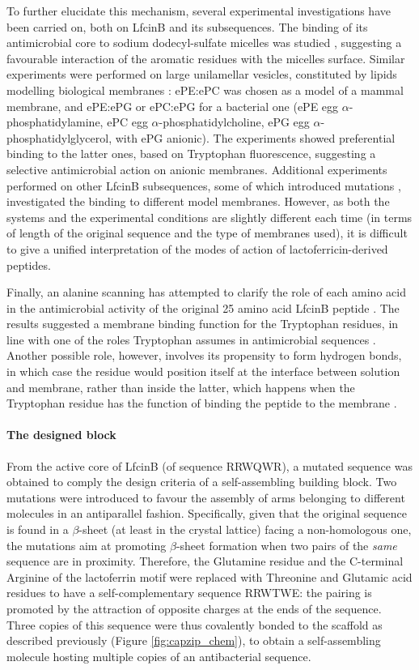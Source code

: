 To further elucidate this mechanism, several experimental investigations have been carried on, both on LfcinB and its subsequences. The binding of its antimicrobial core to sodium dodecyl-sulfate micelles was studied \citep{Schibli1999}, suggesting a favourable interaction of the aromatic residues with the micelles surface.
%
Similar experiments were performed on large unilamellar vesicles, constituted by lipids modelling biological membranes \citep{Nguyen2005}: ePE:ePC was chosen as a model of a mammal membrane, and ePE:ePG or ePC:ePG for a bacterial one (ePE egg $\alpha$-phosphatidylamine, ePC egg $\alpha$-phosphatidylcholine, ePG egg $\alpha$-phosphatidylglycerol, with ePG anionic). The experiments showed preferential binding to the latter ones, based on Tryptophan fluorescence, suggesting a selective antimicrobial action on anionic membranes.
%
Additional experiments performed on other LfcinB subsequences, some of which introduced mutations \citep{Tsutsumi2012,Arseneault2010}, investigated the binding to different model membranes. However, as both the systems and the experimental conditions are slightly different each time (in terms of length of the original sequence and the type of membranes used), it is difficult to give a unified interpretation of the modes of action of lactoferricin-derived peptides.

Finally, an alanine scanning has attempted to clarify the role of each amino acid in the antimicrobial activity of the original 25 amino acid LfcinB peptide \citep{Strom2002}. The results suggested a membrane binding function for the Tryptophan residues, in line with one of the roles Tryptophan assumes in antimicrobial sequences \citep{Chan2006}.
%
Another possible role, however, involves its propensity to form hydrogen bonds, in which case the residue would position itself at the interface between solution and membrane, rather than inside the latter, which happens when the Tryptophan residue has the function of binding the peptide to the membrane \citep{Chan2006}.

\paragraph{The designed block}
From the active core of LfcinB (of sequence RRWQWR), a mutated sequence was obtained to comply the design criteria of a self-assembling building block. Two mutations were introduced to favour the assembly of arms belonging to different molecules in an antiparallel fashion. Specifically, given that the original sequence is found in a $\beta$-sheet (at least in the crystal lattice) facing a non-homologous one, the mutations aim at promoting  $\beta$-sheet formation when two pairs of the \emph{same} sequence are in proximity. Therefore, the Glutamine residue and the C-terminal Arginine of the lactoferrin motif were replaced with Threonine and Glutamic acid residues to have a self-complementary sequence RRWTWE: the pairing is promoted by the attraction of opposite charges at the ends of the sequence.
%
Three copies of this sequence were thus covalently bonded to the scaffold as described previously (Figure \ref{fig:capzip_chem}), to obtain a self-assembling molecule hosting multiple copies of an antibacterial sequence.


